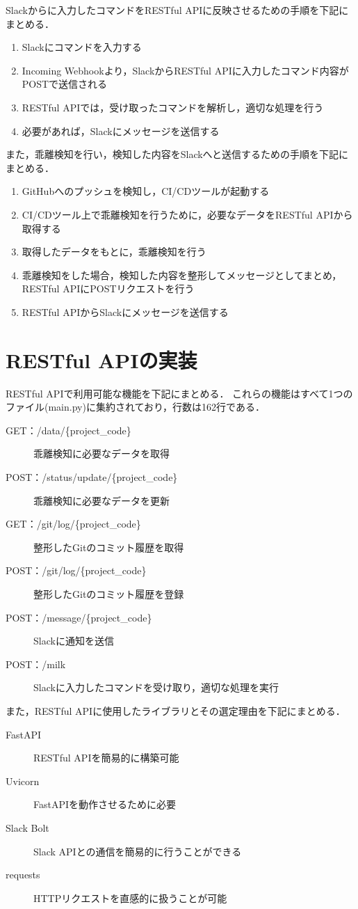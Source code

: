 Slackからに入力したコマンドをRESTful APIに反映させるための手順を下記にまとめる．
\begin{enumerate}
    \item Slackにコマンドを入力する
    \item Incoming Webhookより，SlackからRESTful APIに入力したコマンド内容がPOSTで送信される
    \item RESTful APIでは，受け取ったコマンドを解析し，適切な処理を行う
    \item 必要があれば，Slackにメッセージを送信する
\end{enumerate}

また，乖離検知を行い，検知した内容をSlackへと送信するための手順を下記にまとめる．
\begin{enumerate}
    \item GitHubへのプッシュを検知し，CI/CDツールが起動する
    \item CI/CDツール上で乖離検知を行うために，必要なデータをRESTful APIから取得する
    \item 取得したデータをもとに，乖離検知を行う
    \item 乖離検知をした場合，検知した内容を整形してメッセージとしてまとめ，RESTful APIにPOSTリクエストを行う
    \item RESTful APIからSlackにメッセージを送信する
\end{enumerate}

\section{RESTful APIの実装}
RESTful APIで利用可能な機能を下記にまとめる．
これらの機能はすべて1つのファイル(main.py)に集約されており，行数は162行である．
\begin{description}
    \item[GET：/data/\{project\_code\}] 乖離検知に必要なデータを取得
    \item[POST：/status/update/\{project\_code\}]  乖離検知に必要なデータを更新
    \item[GET：/git/log/\{project\_code\}] 整形したGitのコミット履歴を取得
    \item[POST：/git/log/\{project\_code\}] 整形したGitのコミット履歴を登録
    \item[POST：/message/\{project\_code\}] Slackに通知を送信
    \item[POST：/milk] Slackに入力したコマンドを受け取り，適切な処理を実行
\end{description}

また，RESTful APIに使用したライブラリとその選定理由を下記にまとめる．
\begin{description}
    \item[FastAPI] RESTful APIを簡易的に構築可能
    \item[Uvicorn] FastAPIを動作させるために必要
    \item[Slack Bolt] Slack APIとの通信を簡易的に行うことができる
    \item[requests] HTTPリクエストを直感的に扱うことが可能
\end{description}

